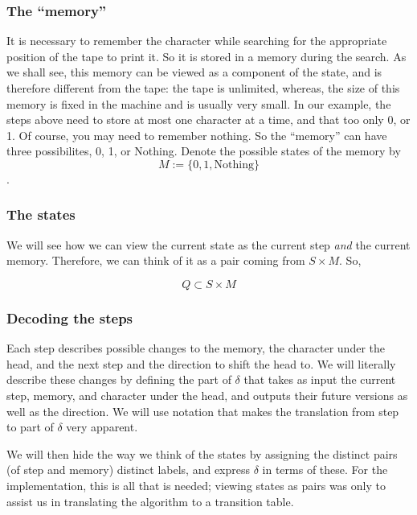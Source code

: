 \hypertarget{the-memory}{%
\subsubsection{The ``memory''}\label{the-memory}}

It is necessary to remember the character while searching for the
appropriate position of the tape to print it. So it is stored in a
memory during the search. As we shall see, this memory can be viewed as
a component of the state, and is therefore different from the tape: the
tape is unlimited, whereas, the size of this memory is fixed in the
machine and is usually very small. In our example, the steps above need
to store at most one character at a time, and that too only 0, or 1. Of
course, you may need to remember nothing. So the ``memory'' can have
three possibilites, 0, 1, or Nothing. Denote the possible states of the
memory by \[M :=\{ 0, 1, \text{Nothing} \}\].

\hypertarget{the-states}{%
\subsubsection{The states}\label{the-states}}

We will see how we can view the current state as the current step
\emph{and} the current memory. Therefore, we can think of it as a pair
coming from \(S \times M\). So,

\[Q \subset S \times M\]

\hypertarget{decoding-the-steps}{%
\subsubsection{Decoding the steps}\label{decoding-the-steps}}

Each step describes possible changes to the memory, the character under
the head, and the next step and the direction to shift the head to. We
will literally describe these changes by defining the part of \(\delta\)
that takes as input the current step, memory, and character under the
head, and outputs their future versions as well as the direction. We
will use notation that makes the translation from step to part of
\(\delta\) very apparent.

We will then hide the way we think of the states by assigning the
distinct pairs (of step and memory) distinct labels, and express
\(\delta\) in terms of these. For the implementation, this is all that
is needed; viewing states as pairs was only to assist us in translating
the algorithm to a transition table.

